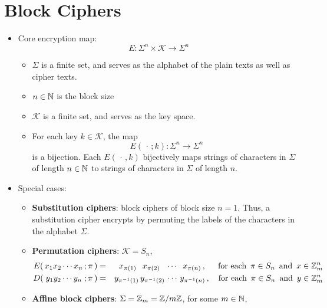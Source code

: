 
\section{Block Ciphers}
\setcounter{theorem}{0}
\setcounter{equation}{0}

\begin{itemize}
\item
	Core encryption map:
	\begin{equation*}
	E : \Sigma^{n} \times \mathcal{K} \longrightarrow \Sigma^{n}\,
	\end{equation*}
	\begin{itemize}
	\item
		$\Sigma$ is a finite set, and serves as the alphabet of the plain texts as well as cipher texts.
	\item
		$n \in \mathbb{N}$ is the block size
	\item
		$\mathcal{K}$ is a finite set, and serves as the key space.
	\item
		For each key $k \in \mathcal{K}$, the map
		\begin{equation*}
		E(\,\cdot\,;k) : \Sigma^{n} \longrightarrow \Sigma^{n}
		\end{equation*}
		is a bijection.
		Each $E(\,\cdot\,,k)$ bijectively maps strings of characters in $\Sigma$ of length $n \in \mathbb{N}$
		to strings of characters in $\Sigma$ of length $n$.
	\end{itemize}
\item
	Special cases:
	\begin{itemize}
	\item
		\textbf{Substitution ciphers}: block ciphers of block size $n = 1$.
		Thus, a substitution cipher encrypts by permuting the labels of the characters in the alphabet $\Sigma$.
	\item
		\textbf{Permutation ciphers}: $\mathcal{K} = S_{n}$,
		\begin{eqnarray*}
		E\!\left(\,x_{1}x_{2} \cdots x_{n}\,;\pi\,\right)
		& = &
			\;\; x_{\pi(1)} \;\;\, x_{\pi(2)} \;\;\, \cdots \;\; x_{\pi(n)} \,,
		\quad\;\,
		\textnormal{for each \,$\pi \in S_{n}$\, and \,$x \in \mathbb{Z}_{m}^{n}$}
		\\
		D\!\left(\;y_{1}y_{2} \cdots y_{n}\;;\pi\,\right)
		& = &
			y_{\pi^{-1}(1)}\,y_{\pi^{-1}(2)} \, \cdots \, y_{\pi^{-1}(n)}\,,
		\quad
		\textnormal{for each \,$\pi \in S_{n}$\, and \,$y \in \mathbb{Z}_{m}^{n}$}
		\end{eqnarray*}
	\item
		\textbf{Affine block ciphers}: $\Sigma = \mathbb{Z}_{m} = \mathbb{Z} / m\mathbb{Z}$, for some $m \in \mathbb{N}$,

\end{itemize}
\end{itemize}
